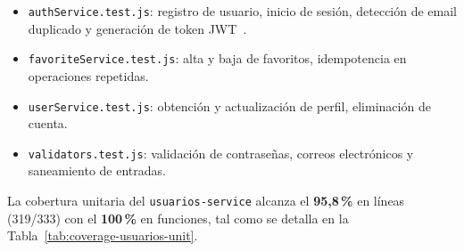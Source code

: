 \begin{itemize}
  \item \texttt{authService.test.js}: registro de usuario, inicio de sesión, detección de
        email duplicado y generación de token JWT~\cite{fastify_jwt}.
  \item \texttt{favoriteService.test.js}: alta y baja de favoritos, idempotencia en
        operaciones repetidas.
  \item \texttt{userService.test.js}: obtención y actualización de perfil, eliminación
        de cuenta.
  \item \texttt{validators.test.js}: validación de contraseñas, correos electrónicos y
        saneamiento de entradas.
\end{itemize}

La cobertura unitaria del \texttt{usuarios-service} alcanza el \textbf{95,8\,\%} en líneas
(319/333) con el \textbf{100\,\%} en funciones, tal como se detalla en la
Tabla~\ref{tab:coverage-usuarios-unit}.

